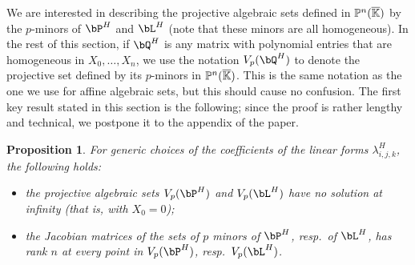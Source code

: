 \documentclass[12pt]{article}
\newtheorem{proposition}[definition]{Proposition}
\begin{document}
We are interested in describing the projective algebraic sets defined
in $\mathbb{P}^n(\overline{\mathbb{K}})$ by the $p$-minors of $\bP^H$ and $\bL^H$ (note that
these minors are all homogeneous). In the rest of this section, if
$\bQ^H$ is any matrix with polynomial entries that are homogeneous in
$X_0,\dots,X_n$, we use the notation $V_p(\bQ^H)$ to denote the
projective set defined by its $p$-minors in $\mathbb{P}^n(\overline{\mathbb{K}})$.  This is
the same notation as the one we use for affine algebraic sets, but
this should cause no confusion. The first key result stated in this
section is the following; since the proof is rather lengthy and
technical, we postpone it to the appendix of the paper.

\begin{proposition}\label{lemma:appendix}
  For generic choices of the coefficients of the linear forms
  $\lambda^H_{i,j,k}$, the following holds:
  \begin{itemize}
  \item the projective algebraic sets $V_p(\bP^H)$ and $V_p(\bL^H)$
    have no solution at infinity (that is, with $X_0=0$);
  \item the Jacobian matrices of the sets of $p$ minors 
    of $\bP^H$, resp.\ of $\bL^H$, has rank $n$ at every point 
    in $V_p(\bP^H)$, resp.\ $V_p(\bL^H)$.
\end{itemize}
\end{proposition}
\end{document}

